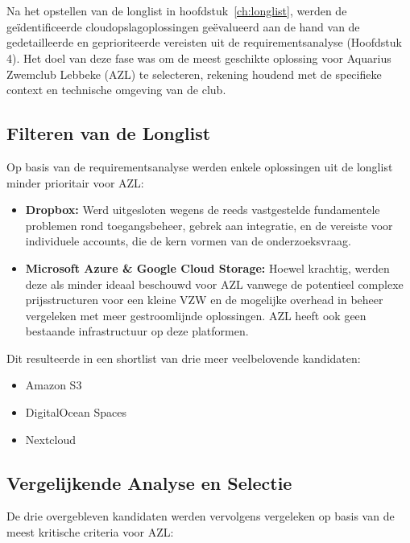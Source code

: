 \chapter{}
\label{ch:shortlist}

Na het opstellen van de longlist in hoofdstuk~\ref{ch:longlist}, werden de geïdentificeerde cloudopslagoplossingen geëvalueerd aan de hand van de gedetailleerde en geprioriteerde vereisten uit de requirementsanalyse (Hoofdstuk 4). Het doel van deze fase was om de meest geschikte oplossing voor Aquarius Zwemclub Lebbeke (AZL) te selecteren, rekening houdend met de specifieke context en technische omgeving van de club.

\section*{Filteren van de Longlist} 

Op basis van de requirementsanalyse werden enkele oplossingen uit de longlist minder prioritair voor AZL:
\begin{itemize}
    \item \textbf{Dropbox:} Werd uitgesloten wegens de reeds vastgestelde fundamentele problemen rond toegangsbeheer, gebrek aan integratie, en de vereiste voor individuele accounts, die de kern vormen van de onderzoeksvraag.
    \item \textbf{Microsoft Azure \& Google Cloud Storage:} Hoewel krachtig, werden deze als minder ideaal beschouwd voor AZL vanwege de potentieel complexe prijsstructuren voor een kleine VZW en de mogelijke overhead in beheer vergeleken met meer gestroomlijnde oplossingen. AZL heeft ook geen bestaande infrastructuur op deze platformen.
\end{itemize}

Dit resulteerde in een shortlist van drie meer veelbelovende kandidaten:
\begin{itemize}
    \item Amazon S3
    \item DigitalOcean Spaces
    \item Nextcloud
\end{itemize}

\section*{Vergelijkende Analyse en Selectie}

De drie overgebleven kandidaten werden vervolgens vergeleken op basis van de meest kritische criteria voor AZL:

